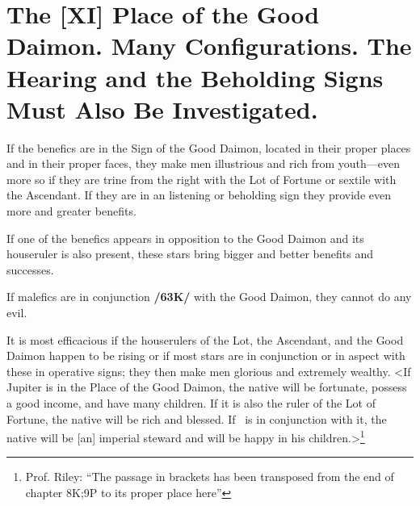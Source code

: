 \section{The [XI] Place of the Good Daimon. Many Configurations. The Hearing and the Beholding Signs Must Also Be Investigated.}
If the benefics are in the Sign of the Good Daimon, located in their proper places and in their proper faces, they make men illustrious and rich from youth—even more so if they are trine from the right with the Lot of Fortune or sextile with the Ascendant. If they are in an listening or beholding sign they provide even more and greater benefits. 

If one of the benefics appears in opposition to the Good Daimon and its houseruler is also present, these stars bring bigger and better benefits and successes. 

If malefics are in conjunction \textbf{/63K/} with the Good Daimon, they cannot do any evil. 

It is most efficacious if the houserulers of the Lot, the Ascendant, and the Good Daimon happen to be rising or if most stars are in conjunction or in aspect with these in operative signs; they then make men glorious and extremely wealthy. 
<If Jupiter is in the Place of the Good Daimon, the native will be fortunate, possess a good income, and have many
children. If it is also the ruler of the Lot of Fortune, the native will be rich and blessed. If \Mercury\, is in conjunction with it, the native will be [an] imperial steward and will be happy in his children.>\footnote{Prof. Riley: ``The passage in brackets has been transposed from the end of chapter 8K;9P to its proper place here''}

\newpage